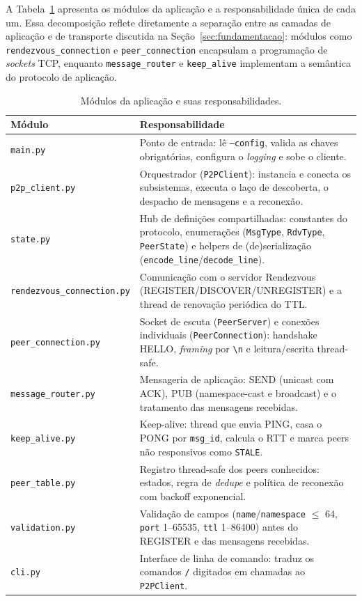\documentclass[12pt, a4paper]{article}
\begin{document}
A Tabela~\ref{tab:modulos} apresenta os módulos da aplicação e a responsabilidade única de cada um. Essa decomposição reflete diretamente a separação entre as camadas de aplicação e de transporte discutida na Seção~\ref{sec:fundamentacao}: módulos como \texttt{rendezvous\_connection} e \texttt{peer\_connection} encapsulam a programação de \textit{sockets} TCP, enquanto \texttt{message\_router} e \texttt{keep\_alive} implementam a semântica do protocolo de aplicação.

\begin{table}[h]
\centering
\caption{Módulos da aplicação e suas responsabilidades.}
\label{tab:modulos}
\begin{tabular}{|l|p{9.5cm}|}
\hline
\textbf{Módulo} & \textbf{Responsabilidade} \\
\hline
\texttt{main.py} & Ponto de entrada: lê \texttt{--config}, valida as chaves obrigatórias, configura o \textit{logging} e sobe o cliente. \\
\hline
\texttt{p2p\_client.py} & Orquestrador (\texttt{P2PClient}): instancia e conecta os subsistemas, executa o laço de descoberta, o despacho de mensagens e a reconexão. \\
\hline
\texttt{state.py} & Hub de definições compartilhadas: constantes do protocolo, enumerações (\texttt{MsgType}, \texttt{RdvType}, \texttt{PeerState}) e helpers de (de)serialização (\texttt{encode\_line}/\texttt{decode\_line}). \\
\hline
\texttt{rendezvous\_connection.py} & Comunicação com o servidor Rendezvous (REGISTER/DISCOVER/UNREGISTER) e a thread de renovação periódica do TTL. \\
\hline
\texttt{peer\_connection.py} & Socket de escuta (\texttt{PeerServer}) e conexões individuais (\texttt{PeerConnection}): handshake HELLO, \textit{framing} por \texttt{\textbackslash n} e leitura/escrita thread-safe. \\
\hline
\texttt{message\_router.py} & Mensageria de aplicação: SEND (unicast com ACK), PUB (namespace-cast e broadcast) e o tratamento das mensagens recebidas. \\
\hline
\texttt{keep\_alive.py} & Keep-alive: thread que envia PING, casa o PONG por \texttt{msg\_id}, calcula o RTT e marca peers não responsivos como \texttt{STALE}. \\
\hline
\texttt{peer\_table.py} & Registro thread-safe dos peers conhecidos: estados, regra de \textit{dedupe} e política de reconexão com backoff exponencial. \\
\hline
\texttt{validation.py} & Validação de campos (\texttt{name}/\texttt{namespace} $\leq$ 64, \texttt{port} 1--65535, \texttt{ttl} 1--86400) antes do REGISTER e das mensagens recebidas. \\
\hline
\texttt{cli.py} & Interface de linha de comando: traduz os comandos \texttt{/} digitados em chamadas ao \texttt{P2PClient}. \\
\hline
\end{tabular}
\end{table}
\end{document}
